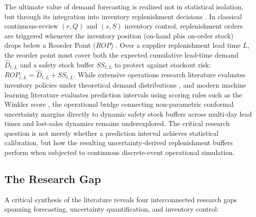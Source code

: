 The ultimate value of demand forecasting is realized not in statistical isolation, but through its integration into inventory replenishment decisions \cite{syntetos2016supply}. In classical continuous-review $(r, Q)$ and $(s, S)$ inventory control, replenishment orders are triggered whenever the inventory position (on-hand plus on-order stock) drops below a Reorder Point ($ROP$) \cite{axsaeter2015inventory}. Over a supplier replenishment lead time $L$, the reorder point must cover both the expected cumulative lead-time demand $\hat{D}_{t,L}$ and a safety stock buffer $SS_{t,L}$ to protect against stockout risk: $ROP_{t,L} = \hat{D}_{t,L} + SS_{t,L}$. While extensive operations research literature evaluates inventory policies under theoretical demand distributions \cite{snyder2019fundamentals}, and modern machine learning literature evaluates prediction intervals using scoring rules such as the Winkler score \cite{gneiting2007strictly}, the operational bridge connecting non-parametric conformal uncertainty margins directly to dynamic safety stock buffers across multi-day lead times and lost-sales dynamics remains underexplored. The critical research question is not merely whether a prediction interval achieves statistical calibration, but how the resulting uncertainty-derived replenishment buffers perform when subjected to continuous discrete-event operational simulation.

\subsection{The Research Gap}
A critical synthesis of the literature reveals four interconnected research gaps spanning forecasting, uncertainty quantification, and inventory control:


